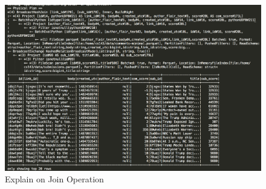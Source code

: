 \documentclass[12pt]{article}
\begin{document}
\begin{figure}[!h]
     \begin{center}
                  \includegraphics[width=1.12\textwidth]{explain.png}
    \end{center}
    \caption{%
       Explain on Join Operation
     }%
     \label {fig:explain}
 \end{figure}
 
\end{document}

